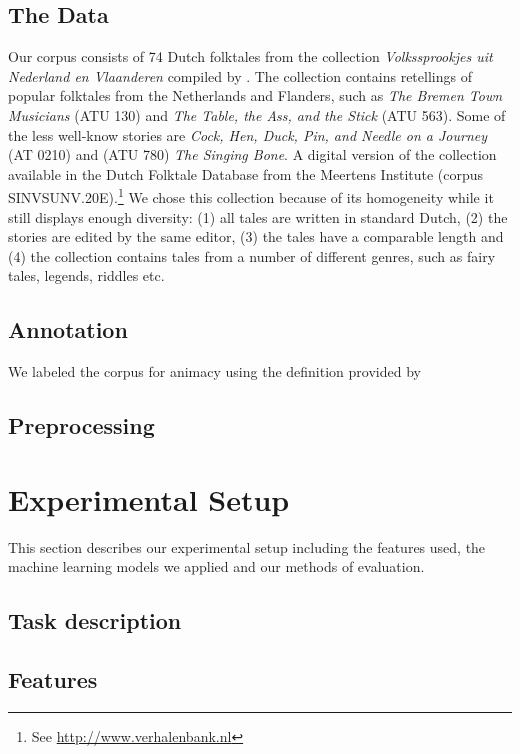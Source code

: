 \documentclass[a4paper,UKenglish]{oasics}
\begin{document}
\subsection{The Data}
Our corpus consists of 74 Dutch folktales from the collection
\textit{Volkssprookjes uit Nederland en Vlaanderen} compiled by
\cite{sinninghe:78}. The collection contains retellings of popular
folktales from the Netherlands and Flanders, such as \textit{The
  Bremen Town Musicians} (ATU 130) and \textit{The Table, the Ass, and
  the Stick } (ATU 563). Some of the less well-know stories are
\textit{Cock, Hen, Duck, Pin, and Needle on a Journey} (AT 0210) and
(ATU 780) \textit{The Singing Bone}. A digital version of the
collection available in the Dutch Folktale Database from the Meertens
Institute (corpus SINVSUNV.20E).\footnote{See
  \url{http://www.verhalenbank.nl}} We chose this collection because
of its homogeneity while it still displays enough diversity: (1) all
tales are written in standard Dutch, (2) the stories are edited by the
same editor, (3) the tales have a comparable length and (4) the
collection contains tales from a number of different genres, such as
fairy tales, legends, riddles etc.

\subsection{Annotation}
We labeled the corpus for animacy using the definition provided by

\subsection{Preprocessing}


\section{Experimental Setup}
This section describes our experimental setup including the features
used, the machine learning models we applied and our methods of
evaluation.

\subsection{Task description}

\subsection{Features}
\end{document}

